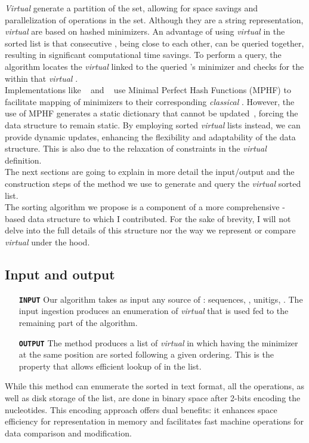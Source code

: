 \emph{Virtual} \skmers generate a partition of the \kmer set, allowing for space savings and parallelization of operations in the set. Although they are a string representation, \emph{virtual} \skmers are based on hashed minimizers. An advantage of using \emph{virtual} \skmers in the sorted list is that consecutive \kmers, being close to each other, can be queried together, resulting in significant computational time savings. To perform a query, the algorithm locates the \emph{virtual} \skmer linked to the queried \kmer's minimizer and checks for the \kmer within that \emph{virtual} \skmer.\\
Implementations like \blight~\cite{blight} and \ssh~\cite{sshash} use Minimal Perfect Hash Functions (\gls{MPHF}) to facilitate mapping of minimizers to their corresponding \emph{classical} \skmers. However, the use of MPHF generates a static dictionary that cannot be updated~\cite{smsketch}, forcing the data structure to remain static. By employing sorted \emph{virtual} \skmers lists instead, we can provide dynamic updates, enhancing the flexibility and adaptability of the data structure. This is also due to the relaxation of constraints in the \emph{virtual} \skmer definition. \\
The next sections are going to explain in more detail the input/output and the construction steps of the method we use to generate and query the \emph{virtual} \skmer sorted list.\\
The \skmer sorting algorithm we propose is a component of a more comprehensive \skmer-based data structure to which I contributed. For the sake of brevity, I will not delve into the full details of this structure nor the way we represent or compare \emph{virtual} \skmers under the hood.

\subsection{Input and output}
\begin{itemize}
	\item[\textbf{\texttt{INPUT}}] Our algorithm takes as input any source of \kmers: sequences, \skmers, unitigs, \kmers. The input ingestion produces an enumeration of \emph{virtual} \skmers that is used fed to the remaining part of the algorithm.
	\item[\textbf{\texttt{OUTPUT}}] The method produces a list of \emph{virtual} \skmer in which \kmers having the minimizer at the same position are sorted following a given ordering. This is the property that allows efficient lookup of \kmers in the list.
\end{itemize}
While this method can enumerate the sorted \skmer in text format, all the operations, as well as disk storage of the list, are done in binary space after 2-bits encoding the nucleotides. This encoding approach offers dual benefits: it enhances space efficiency for \kmer representation in memory and facilitates fast machine operations for data comparison and modification.


